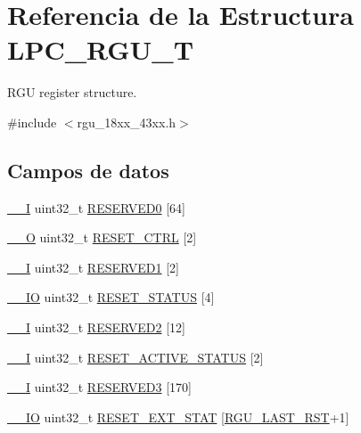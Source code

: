 \hypertarget{struct_l_p_c___r_g_u___t}{}\section{Referencia de la Estructura L\+P\+C\+\_\+\+R\+G\+U\+\_\+T}
\label{struct_l_p_c___r_g_u___t}


R\+GU register structure.  




{\ttfamily \#include $<$rgu\+\_\+18xx\+\_\+43xx.\+h$>$}

\subsection*{Campos de datos}
\begin{DoxyCompactItemize}
\item 
\hyperlink{core__sc300_8h_af63697ed9952cc71e1225efe205f6cd3}{\+\_\+\+\_\+I} uint32\+\_\+t \hyperlink{struct_l_p_c___r_g_u___t_af58c5fd1a07d6436db757863729ffc99}{R\+E\+S\+E\+R\+V\+E\+D0} \mbox{[}64\mbox{]}
\item 
\hyperlink{core__sc300_8h_a7e25d9380f9ef903923964322e71f2f6}{\+\_\+\+\_\+O} uint32\+\_\+t \hyperlink{struct_l_p_c___r_g_u___t_a934d7cc5bb269f45b14d7fd4761d2f46}{R\+E\+S\+E\+T\+\_\+\+C\+T\+RL} \mbox{[}2\mbox{]}
\item 
\hyperlink{core__sc300_8h_af63697ed9952cc71e1225efe205f6cd3}{\+\_\+\+\_\+I} uint32\+\_\+t \hyperlink{struct_l_p_c___r_g_u___t_a67272bc257c032693d52097a78451784}{R\+E\+S\+E\+R\+V\+E\+D1} \mbox{[}2\mbox{]}
\item 
\hyperlink{core__sc300_8h_aec43007d9998a0a0e01faede4133d6be}{\+\_\+\+\_\+\+IO} uint32\+\_\+t \hyperlink{struct_l_p_c___r_g_u___t_a046d33055aea08e80d1bbfbbab9b43e6}{R\+E\+S\+E\+T\+\_\+\+S\+T\+A\+T\+US} \mbox{[}4\mbox{]}
\item 
\hyperlink{core__sc300_8h_af63697ed9952cc71e1225efe205f6cd3}{\+\_\+\+\_\+I} uint32\+\_\+t \hyperlink{struct_l_p_c___r_g_u___t_a8ef8e2ec407e4e4c350cd8b370d7cadf}{R\+E\+S\+E\+R\+V\+E\+D2} \mbox{[}12\mbox{]}
\item 
\hyperlink{core__sc300_8h_af63697ed9952cc71e1225efe205f6cd3}{\+\_\+\+\_\+I} uint32\+\_\+t \hyperlink{struct_l_p_c___r_g_u___t_afefb87caf05582948b30c219edfcd2e3}{R\+E\+S\+E\+T\+\_\+\+A\+C\+T\+I\+V\+E\+\_\+\+S\+T\+A\+T\+US} \mbox{[}2\mbox{]}
\item 
\hyperlink{core__sc300_8h_af63697ed9952cc71e1225efe205f6cd3}{\+\_\+\+\_\+I} uint32\+\_\+t \hyperlink{struct_l_p_c___r_g_u___t_abf5aa820a604f8ba570f6a2704b3dae8}{R\+E\+S\+E\+R\+V\+E\+D3} \mbox{[}170\mbox{]}
\item 
\hyperlink{core__sc300_8h_aec43007d9998a0a0e01faede4133d6be}{\+\_\+\+\_\+\+IO} uint32\+\_\+t \hyperlink{struct_l_p_c___r_g_u___t_a29b838d12b115f054028a29a177a3466}{R\+E\+S\+E\+T\+\_\+\+E\+X\+T\+\_\+\+S\+T\+AT} \mbox{[}\hyperlink{group___r_g_u__18_x_x__43_x_x_ggaba95b3f477c73ccfad274a65a9c97a9eacf1bcccbc49254edfcb4a3540a7c8b67}{R\+G\+U\+\_\+\+L\+A\+S\+T\+\_\+\+R\+ST}+1\mbox{]}
\end{DoxyCompactItemize}


